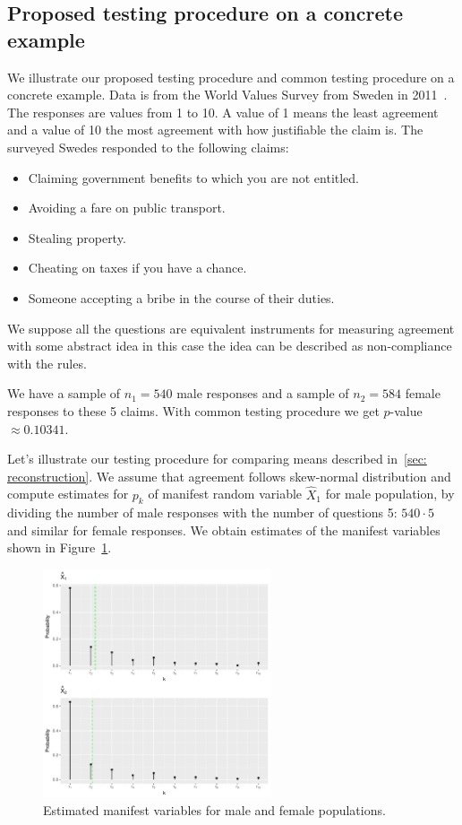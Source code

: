 \documentclass[10pt]{article}
\begin{document}
\subsection{Proposed testing procedure on a concrete example} \label{sec: example}
We illustrate our proposed testing procedure and common testing procedure on a concrete example. Data is from the World Values Survey from Sweden in 2011~\cite{WVS}. The responses are values from 1 to 10. A value of 1 means the least agreement and a value of 10 the most agreement with how justifiable the claim is. The surveyed Swedes responded to the following claims:
\begin{itemize}
  \item Claiming government benefits to which you are not entitled.
  \item Avoiding a fare on public transport.
  \item Stealing property.
  \item Cheating on taxes if you have a chance.
  \item Someone accepting a bribe in the course of their duties.
\end{itemize}

We suppose all the questions are equivalent instruments for measuring agreement with some abstract idea in this case the idea can be described as non-compliance with the rules.

We have a sample of $n_{1} = 540$ male responses and a sample of $n_{2} = 584$ female responses to these 5 claims. With common testing procedure we get $p$-value $\approx 0.10341$. 

Let's illustrate our testing procedure for comparing means described in~\ref{sec: reconstruction}. We assume that agreement follows skew-normal distribution and compute estimates for $p_{k}$ of manifest random variable $\hat{X}_{1}$ for male population, by dividing the number of male responses with the number of questions 5: $540 \cdot 5$ and similar for female responses. We obtain estimates of the manifest variables shown in Figure~\ref{fig: estimates}. 

\begin{figure}
\centering
\includegraphics[width=0.6\textwidth]{example.pdf}
\caption{ Estimated manifest variables for male and female populations.}
\label{fig: estimates}
\end{figure}
\end{document}
